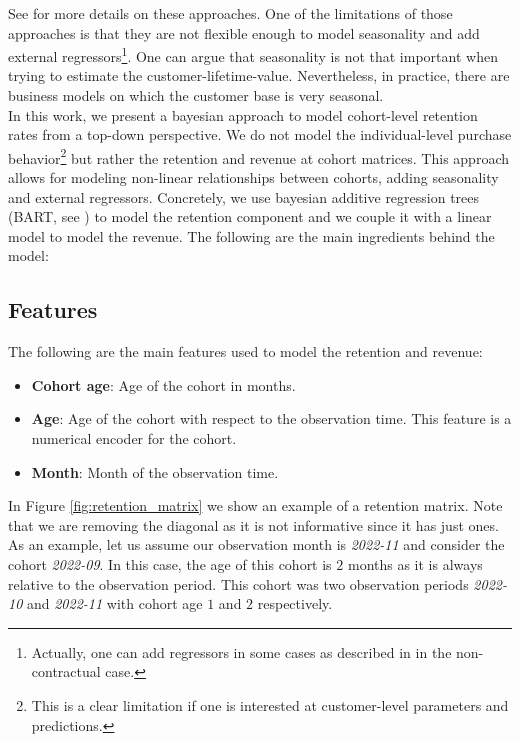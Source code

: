 \documentclass[11pt]{amsart}
\begin{document}
See \cite{FaderHardieNote2017} for more details on these approaches. One of the
limitations of those approaches is that they are not flexible enough to model
seasonality and add external regressors\footnote{Actually, one can add regressors in
some cases as described in \cite{FaderHardieNote2007} in the non-contractual case.}.
One can argue that seasonality is not that important when trying to estimate the
customer-lifetime-value. Nevertheless, in practice, there are business models on which
the customer base is very seasonal. \\

In this work, we present a bayesian approach to model cohort-level retention rates from
a top-down perspective. We do not model the individual-level purchase
behavior\footnote{This is a clear limitation if one is interested at customer-level
parameters and predictions.} but rather the retention and revenue at cohort matrices.
This approach allows for modeling non-linear relationships between cohorts, adding
seasonality and external regressors. Concretely, we use bayesian additive regression
trees (BART, see \cite{quiroga2022bart}) to model the retention component and we couple
it with a linear model to model the revenue. The following are the main ingredients 
behind the model:


\subsection*{Features}
The following are the main features used to model the retention and revenue:
\begin{itemize}
    \item {\bf Cohort age}: Age of the cohort in months.
    \item {\bf Age}: Age of the cohort with respect to the observation time.
        This feature is a numerical encoder for the cohort.
    \item {\bf Month}: Month of the observation time.
\end{itemize}

In Figure \ref{fig:retention_matrix} we show an example of a retention matrix. Note
that we are removing the diagonal as it is not informative since it has just ones. As
an example, let us assume our observation month is {\em 2022-11} and consider the cohort
{\em 2022-09}. In this case, the age of this cohort is $2$ months as it is always
relative to the observation period. This cohort was two observation periods
{\em 2022-10} and {\em 2022-11} with cohort age $1$ and $2$ respectively.\\
\end{document}
